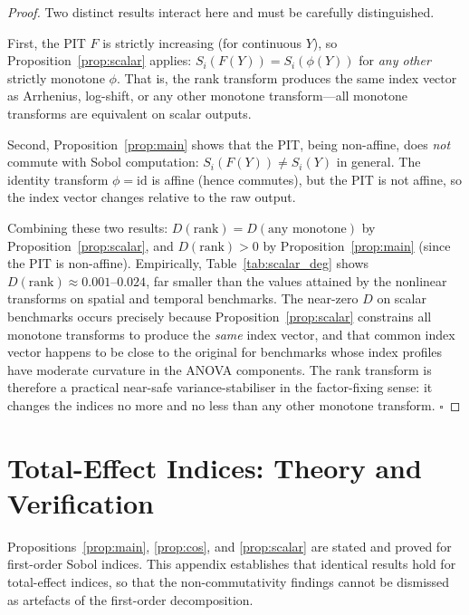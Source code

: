\documentclass[11pt,onecolumn]{article}
\begin{document}
\begin{proof}
Two distinct results interact here and must be carefully distinguished.

First, the PIT $F$ is strictly increasing (for continuous $Y$), so
Proposition~\ref{prop:scalar} applies: $S_i(F(Y)) = S_i(\phi(Y))$ for
\emph{any other} strictly monotone $\phi$.  That is, the rank transform
produces the same index vector as Arrhenius, log-shift, or any other
monotone transform---all monotone transforms are equivalent on scalar
outputs.

Second, Proposition~\ref{prop:main} shows that the PIT, being non-affine,
does \emph{not} commute with Sobol computation: $S_i(F(Y)) \neq S_i(Y)$
in general.  The identity transform $\phi = \mathrm{id}$ is affine
(hence commutes), but the PIT is not affine, so the index vector changes
relative to the raw output.

Combining these two results: $D(\text{rank}) = D(\text{any monotone})$ by
Proposition~\ref{prop:scalar}, and $D(\text{rank}) > 0$ by
Proposition~\ref{prop:main} (since the PIT is non-affine).
Empirically, Table~\ref{tab:scalar_deg} shows
$D(\text{rank}) \approx 0.001$--$0.024$, far smaller than the values
attained by the nonlinear transforms on spatial and temporal benchmarks.
The near-zero $D$ on scalar benchmarks occurs precisely because
Proposition~\ref{prop:scalar} constrains all monotone transforms to produce
the \emph{same} index vector, and that common index vector happens to be
close to the original for benchmarks whose index profiles have moderate
curvature in the ANOVA components.  The rank transform is therefore a
practical near-safe variance-stabiliser in the factor-fixing sense: it
changes the indices no more and no less than any other monotone transform.
$\square$
\end{proof}

\section{Total-Effect Indices: Theory and Verification}
\label{app:total_effects}

Propositions~\ref{prop:main}, \ref{prop:cos}, and \ref{prop:scalar} are stated
and proved for first-order Sobol indices.  This appendix establishes that
identical results hold for total-effect indices, so that the non-commutativity
findings cannot be dismissed as artefacts of the first-order decomposition.
\end{document}
